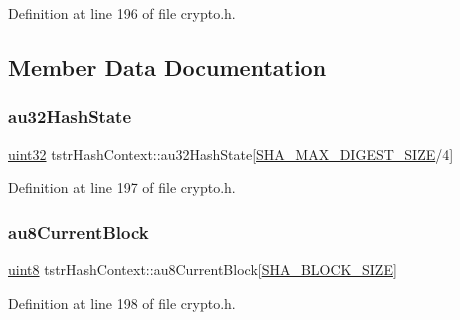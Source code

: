 Definition at line 196 of file crypto.\+h.



\subsection{Member Data Documentation}
\mbox{\label{structtstrHashContext_a98c3033fa6c3fcfb2fde0f8d9e4b77cd}} 
\subsubsection{\texorpdfstring{au32\+Hash\+State}{au32HashState}}
{\footnotesize\ttfamily \hyperlink{group__DataT_ga100e7c691a47d6978527c479a0158245}{uint32} tstr\+Hash\+Context\+::au32\+Hash\+State\mbox{[}\hyperlink{third__party_2atmel_2devices_2wilc1000_2drv__hash_2crypto_8h_a0391b26f91f9df705826a5770d1b34b5}{S\+H\+A\+\_\+\+M\+A\+X\+\_\+\+D\+I\+G\+E\+S\+T\+\_\+\+S\+I\+ZE}/4\mbox{]}}



Definition at line 197 of file crypto.\+h.

\mbox{\label{structtstrHashContext_ad800fad9e6b7da0be3599969634ae4dd}} 
\subsubsection{\texorpdfstring{au8\+Current\+Block}{au8CurrentBlock}}
{\footnotesize\ttfamily \hyperlink{group__DataT_ga4df709a77647e870bbf1d955b8edc9a6}{uint8} tstr\+Hash\+Context\+::au8\+Current\+Block\mbox{[}\hyperlink{third__party_2atmel_2devices_2wilc1000_2drv__hash_2crypto_8h_a7b4bbf50f237712b1e9bcc3283e41199}{S\+H\+A\+\_\+\+B\+L\+O\+C\+K\+\_\+\+S\+I\+ZE}\mbox{]}}



Definition at line 198 of file crypto.\+h.

\mbox{\label{structtstrHashContext_a85933854439e5041779b7c36d03f2ed1}} 
